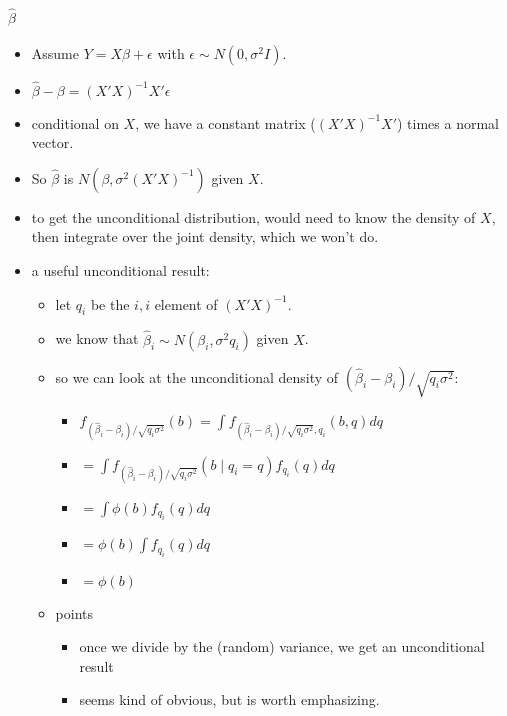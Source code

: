 \paragraph{$\hat\beta$}
\begin{itemize}
\item Assume $Y = X\beta + \epsilon$ with $\epsilon \sim N(0,\sigma^2 I)$.
\item $\hat\beta - \beta = (X'X)^{-1} X'\epsilon$
\item conditional on $X$, we have a constant matrix ($(X'X)^{-1}X'$)
        times a normal vector.
\item So $\hat\beta$ is $N(\beta, \sigma^2 (X'X)^{-1})$ given $X$.
\item to get the unconditional distribution, would need to know the
        density of $X$, then integrate over the joint density, which we
        won't do.
\item a useful unconditional result:
\begin{itemize}
\item let $q_i$ be the $i,i$ element of $(X'X)^{-1}$.
\item we know that $\hat\beta_i \sim N(\beta_i, \sigma^2 q_i)$ given $X$.
\item so we can look at the unconditional density of
          $(\hat\beta_i - \beta_i)/\sqrt{q_i \sigma^2}$:
\begin{itemize}
\item $f_{(\hat\beta_i - \beta_i)/\sqrt{q_i \sigma^2}}(b) = \int f_{(\hat\beta_i -
            \beta_i)/\sqrt{q_i \sigma^2}, q_i} (b, q) dq$
\item $= \int f_{(\hat\beta_i - \beta_i)/\sqrt{q_i \sigma^2}}(b \mid q_i = q)
            f_{q_i}(q) dq$
\item $= \int \phi(b) f_{q_i}(q) dq$
\item $= \phi(b) \int f_{q_i}(q) dq$
\item $= \phi(b)$
\end{itemize}
\item points
\begin{itemize}
\item once we divide by the (random) variance, we get an
            unconditional result
\item seems kind of obvious, but is worth emphasizing.
\end{itemize}
\end{itemize}
\end{itemize}

